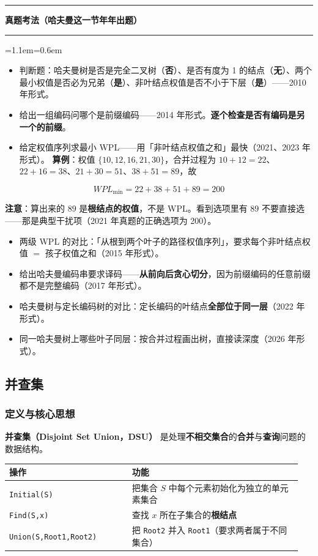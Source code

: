 \documentclass[11pt,openany,UTF8]{ctexbook}
\newcommand{\callouthead}[2]{%
  \par\addvspace{7pt}\noindent
  {\color{#1}\rule[-0.15em]{3pt}{1.05em}}\hspace{0.5em}%
  {\bfseries\color{#1}#2}\par\nobreak\vspace{-0.35em}%
  {\color{rulesep}\hrule height 0.4pt}\nobreak\vspace{0.45em}%
  \begingroup\small\setlength{\parindent}{0pt}%
  \leftskip=1.1em\rightskip=0.6em\noindent\ignorespaces}
\newcommand{\calloutend}{\par\endgroup\addvspace{7pt}}
\newenvironment{callexam}[1]{\callouthead{exambar}{#1}}{\calloutend}
\begin{document}
\begin{callexam}{真题考法（哈夫曼这一节年年出题）}
\begin{itemize}
\item 判断题：哈夫曼树是否是完全二叉树（\textbf{否}）、是否有度为 1 的结点（\textbf{无}）、两个最小权值是否必为兄弟（\textbf{是}）、非叶结点权值是否不小于下层（\textbf{是}）——2010 年形式。
\item 给出一组编码问哪个是前缀编码——2014 年形式。\textbf{逐个检查是否有编码是另一个的前缀}。
\item 给定权值序列求最小 WPL——用「非叶结点权值之和」最快（2021、2023 年形式）。 \textbf{算例}：权值 $\{10,12,16,21,30\}$，合并过程为 $10+12=22$、$22+16=38$、$21+30=51$、$38+51=89$，故
\end{itemize}
\[WPL_{\min}=22+38+51+89=200\]

\textbf{注意}：算出来的 $89$ 是\textbf{根结点的权值}，不是 WPL。看到选项里有 $89$ 不要直接选——那是典型干扰项（2021 年真题的正确选项为 200）。

\begin{itemize}
\item 两级 WPL 的对比：「从根到两个叶子的路径权值序列」，要求每个非叶结点权值 $=$ 孩子权值之和（2015 年形式）。
\item 给出哈夫曼编码串要求译码——\textbf{从前向后贪心切分}，因为前缀编码的任意前缀都不是完整编码（2017 年形式）。
\item 哈夫曼树与定长编码树的对比：定长编码的叶结点\textbf{全部位于同一层}（2022 年形式）。
\item 同一哈夫曼树上哪些叶子同层：按合并过程画出树，直接读深度（2026 年形式）。
\end{itemize}
\end{callexam}

\subsection{并查集}

\subsubsection{定义与核心思想}

\textbf{并查集（Disjoint Set Union，DSU）} 是处理\textbf{不相交集合}的\textbf{合并}与\textbf{查询}问题的数据结构。

\begingroup\small\setlength{\tabcolsep}{4.0pt}
\begin{longtable}{@{}L{0.3995\linewidth}L{0.5461\linewidth}@{}}
\toprule
\textbf{操作} & \textbf{功能} \\
\midrule
\endhead
\texttt{Initial(S)\allowbreak{}} & 把集合 $S$ 中每个元素初始化为独立的单元素集合 \\
\texttt{Find(S,\allowbreak{}x)\allowbreak{}} & 查找 $x$ 所在子集合的\textbf{根结点} \\
\texttt{Union(S,\allowbreak{}Root1,\allowbreak{}Root2)\allowbreak{}} & 把 \texttt{Root2} 并入 \texttt{Root1}（要求两者属于不同集合） \\
\bottomrule
\end{longtable}
\endgroup
\end{document}
